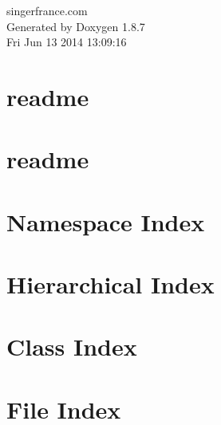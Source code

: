 \documentclass[twoside]{book}
\newcommand{\+}{\discretionary{\mbox{\scriptsize$\hookleftarrow$}}{}{}}
\newcommand{\clearemptydoublepage}{%
  \newpage{\pagestyle{empty}\cleardoublepage}%
}
\begin{document}
\hypersetup{pageanchor=false,
             bookmarks=true,
             bookmarksnumbered=true,
             pdfencoding=unicode
            }
\begin{titlepage}
\vspace*{7cm}
\begin{center}%
{\Large singerfrance.\+com }\\
\vspace*{1cm}
{\large Generated by Doxygen 1.8.7}\\
\vspace*{0.5cm}
{\small Fri Jun 13 2014 13:09:16}\\
\end{center}
\end{titlepage}
\clearemptydoublepage
\tableofcontents
\clearemptydoublepage
{}
\hypersetup{pageanchor=true}

\chapter{readme}
\label{md_src__acme_group__labo_bundle__resources_public_js_tinymce_langs_readme}
\hypertarget{md_src__acme_group__labo_bundle__resources_public_js_tinymce_langs_readme}{}

\chapter{readme}
\label{md_src__acme_group__labo_bundle__resources_public_js_tinymce_skins_lightgray_fonts_readme}
\hypertarget{md_src__acme_group__labo_bundle__resources_public_js_tinymce_skins_lightgray_fonts_readme}{}

\chapter{Namespace Index}

\chapter{Hierarchical Index}

\chapter{Class Index}

\chapter{File Index}

\end{document}
